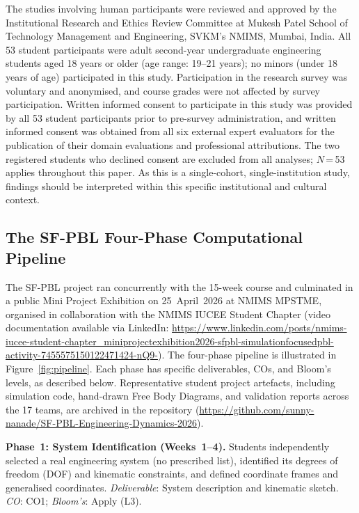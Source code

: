\documentclass[utf8]{FrontiersinHarvard}
\begin{document}
The studies involving human participants were reviewed and approved by the
Institutional Research and Ethics Review Committee at Mukesh Patel School of
Technology Management and Engineering, SVKM's NMIMS, Mumbai, India. All 53
student participants were adult second-year undergraduate engineering students
aged 18 years or older (age range: 19--21 years); no minors (under 18 years of
age) participated in this study. Participation in the research survey was
voluntary and anonymised, and course grades were not affected by survey
participation. Written informed consent to participate in this study was
provided by all 53 student participants prior to pre-survey administration,
and written informed consent was obtained from all six external expert
evaluators for the publication of their domain evaluations and professional
attributions. The two registered students who declined consent are excluded
from all analyses; $N$\,=\,53 applies throughout this paper. As this is a
single-cohort, single-institution study, findings should be interpreted within
this specific institutional and cultural context.

\subsection{The SF-PBL Four-Phase Computational Pipeline}

The SF-PBL project ran concurrently with the 15-week course and culminated
in a public Mini Project Exhibition on 25~April~2026 at NMIMS MPSTME,
organised in collaboration with the NMIMS IUCEE Student Chapter (video documentation available via LinkedIn: \url{https://www.linkedin.com/posts/nmims-iucee-student-chapter_miniprojectexhibition2026-sfpbl-simulationfocusedpbl-activity-7455575150122471424-nQ9-}). The
four-phase pipeline is illustrated in Figure~\ref{fig:pipeline}. Each
phase has specific deliverables, COs, and Bloom's levels, as described below.
Representative student project artefacts, including simulation code, hand-drawn Free Body Diagrams, and validation reports across the 17 teams, are archived in the repository (\url{https://github.com/sunny-nanade/SF-PBL-Engineering-Dynamics-2026}).

\textbf{Phase~1: System Identification (Weeks~1--4).}
Students independently selected a real engineering system (no prescribed
list), identified its degrees of freedom (DOF) and kinematic constraints,
and defined coordinate frames and generalised coordinates.
\textit{Deliverable}: System description and kinematic sketch.
\textit{CO}: CO1; \textit{Bloom's}: Apply (L3).
\end{document}
